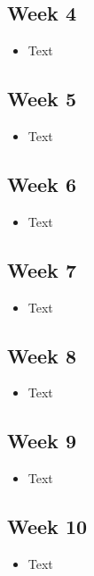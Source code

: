 \documentclass[10pt, onecolumn, draftclsnofoot, letterpaper, compsoc]{IEEEtran}
\begin{document}
\subsection{Week 4}

\begin{itemize}

\item Text

\end{itemize}

\subsection{Week 5}

\begin{itemize}

\item Text

\end{itemize}

\subsection{Week 6}

\begin{itemize}

\item Text

\end{itemize}

\subsection{Week 7}

\begin{itemize}

\item Text

\end{itemize}

\subsection{Week 8}

\begin{itemize}

\item Text

\end{itemize}

\subsection{Week 9}

\begin{itemize}

\item Text

\end{itemize}

\subsection{Week 10}

\begin{itemize}

\item Text

\end{itemize}
\end{document}
